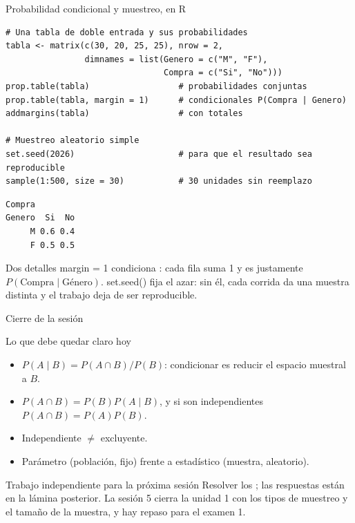 \documentclass[aspectratio=169,10pt]{beamer}
\newcommand{\fx}[1]{{\ttfamily\color{uniAzul}#1}}
\begin{document}
\begin{frame}[fragile]{Probabilidad condicional y muestreo, en R}
  \scriptsize
\begin{lstlisting}[style=Rmini]
# Una tabla de doble entrada y sus probabilidades
tabla <- matrix(c(30, 20, 25, 25), nrow = 2,
                dimnames = list(Genero = c("M", "F"),
                                Compra = c("Si", "No")))
prop.table(tabla)                  # probabilidades conjuntas
prop.table(tabla, margin = 1)      # condicionales P(Compra | Genero)
addmargins(tabla)                  # con totales

# Muestreo aleatorio simple
set.seed(2026)                     # para que el resultado sea reproducible
sample(1:500, size = 30)           # 30 unidades sin reemplazo
\end{lstlisting}
\begin{lstlisting}[style=Rout]
      Compra
Genero  Si  No
     M 0.6 0.4
     F 0.5 0.5
\end{lstlisting}

  \vspace{-0.1cm}
  \begin{alertblock}{Dos detalles}
    \tiny
    \fx{margin = 1} condiciona : cada fila suma 1 y es
    justamente $P(\text{Compra} \mid \text{Género})$. \quad
    \fx{set.seed()} fija el azar: sin él, cada corrida da una muestra distinta
    y el trabajo deja de ser reproducible.
  \end{alertblock}
\end{frame}

\begin{frame}{Cierre de la sesión}
  \begin{block}{Lo que debe quedar claro hoy}
    \begin{itemize}
      \item $P(A\mid B)=P(A\cap B)/P(B)$: condicionar es reducir el espacio
            muestral a $B$.
      \item $P(A\cap B)=P(B)P(A\mid B)$, y si son independientes
            $P(A\cap B)=P(A)P(B)$.
      \item Independiente $\neq$ excluyente.
      \item Parámetro (población, fijo) frente a estadístico (muestra,
            aleatorio).
    \end{itemize}
  \end{block}

  \vspace{0.2cm}
  \begin{alertblock}{Trabajo independiente para la próxima sesión}
    \footnotesize
    Resolver los ; las
    respuestas están en la lámina posterior. La sesión 5 cierra la unidad 1 con
    los tipos de muestreo y el tamaño de la muestra, y hay repaso para el
    examen 1.
  \end{alertblock}
\end{frame}
\end{document}
